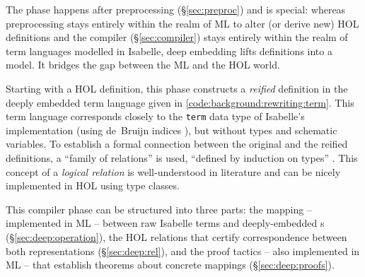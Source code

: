 
\noindent
The  phase happens after preprocessing (§\ref{sec:preproc}) and is special:
whereas preprocessing stays entirely within the realm of ML to alter (or derive new) HOL definitions and the compiler (§\ref{sec:compiler}) stays entirely within the realm of term languages modelled in Isabelle, deep embedding lifts definitions into a model.
It bridges the gap between the ML and the HOL world.

Starting with a HOL definition, this phase constructs a \emph{reified} definition in the deeply embedded term language given in \cref{code:background:rewriting:term}.
This term language corresponds closely to the \texttt{term} data type of Isabelle's implementation (using de~Bruijn indices \cite{debruijn1972lambda}), but without types and schematic variables.
To establish a formal connection between the original and the reified definitions, a ``family of relations'' is used, ``defined by induction on types'' \cite{tait1967interpretations}.
This concept of a \emph{logical relation} is well-understood in literature \cite{hermida2014logical,tait1967interpretations} and can be nicely implemented in HOL using type classes.

This compiler phase can be structured into three parts:
the mapping -- implemented in ML -- between raw Isabelle terms and deeply-embedded s (§\ref{sec:deep:operation}),
the HOL relations that certify correspondence between both representations (§\ref{sec:deep:rel}),
and the proof tactics -- also implemented in ML -- that establish theorems about concrete mappings (§\ref{sec:deep:proofs}).
